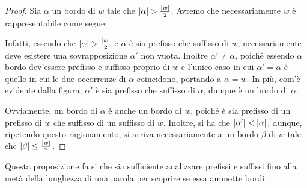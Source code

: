 \begin{proof}
  Sia \(\alpha\) un bordo di \(w\) tale che \(\left|\alpha\right| > \frac{\left|w\right|}{2}\).
  Avremo che necessariamente \(w\) è rappresentabile come segue:
  \begin{figure}[H]
    \centering
  \end{figure}
  Infatti, essendo che \(\left|\alpha\right| > \frac{\left|w\right|}{2}\) e \(\alpha\) è sia prefisso che suffisso di \(w\), necessariamente deve esistere una sovrapposizione \(\alpha'\) non vuota.
  Inoltre \(\alpha'\neq\alpha\), poiché essendo \(\alpha\) bordo dev'essere prefisso e suffisso proprio di \(w\) e l'unico caso in cui \(\alpha' = \alpha\) è quello in cui le due occorrenze di \(\alpha\) coincidono, portando a \(\alpha = w\).
  In più, com'è evidente dalla figura, \(\alpha'\) è sia prefisso che suffisso di \(\alpha\), dunque è un bordo di \(\alpha\).

  Ovviamente, un bordo di \(\alpha\) è anche un bordo di \(w\), poiché è sia prefisso di un prefisso di \(w\) che suffisso di un suffisso di \(w\).
  Inoltre, si ha che \(\left|\alpha'\right| < \left|\alpha\right|\), dunque, ripetendo questo ragionamento, si arriva necessariamente a un bordo \(\beta\) di \(w\) tale che \(\left|\beta\right| \leq \frac{\left|w\right|}{2}\).
\end{proof}

Questa proposizione fa si che sia sufficiente analizzare prefissi e suffissi fino alla metà della lunghezza di una parola per scoprire se essa ammette bordi.

